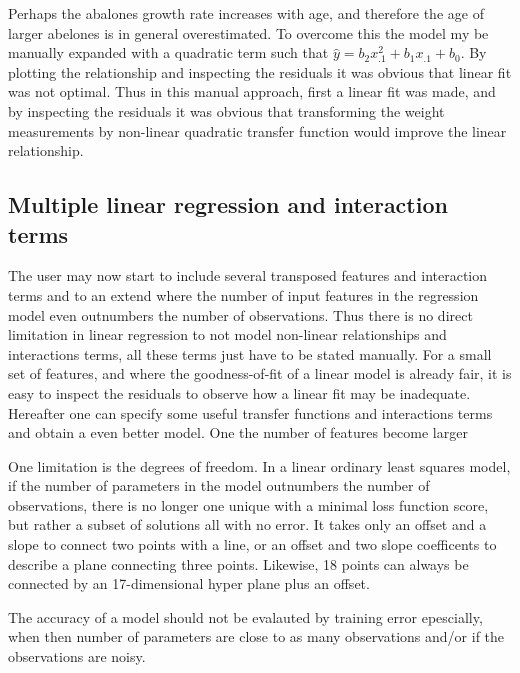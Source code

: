 Perhaps the abalones growth rate increases with age, and therefore the age of larger abelones is in general overestimated. To overcome this the model my be manually expanded with a quadratic term such that $\hat{y} = b_2 x_{.1}^2 + b_1 x_{.1} + b_0$. By plotting the relationship and inspecting the residuals it was obvious that linear fit was not optimal. Thus in this manual approach, first a linear fit was made, and by inspecting the residuals it was obvious that transforming the weight measurements by non-linear quadratic transfer function would improve the linear relationship.

\subsection{Multiple linear regression and interaction terms}
The user may now start to include several transposed features and interaction terms and to an extend where the number of input features in the regression model even outnumbers the number of observations. Thus there is no direct limitation in linear regression to not model non-linear relationships and interactions terms, all these terms just have to be stated manually. For a small set of features, and where the goodness-of-fit of a linear model is already fair, it is easy to inspect the residuals to observe how a linear fit may be inadequate. Hereafter one can specify some useful transfer functions and interactions terms and obtain a even better model. One the number of features become larger

One limitation is the degrees of freedom. In a linear ordinary least squares model, if the number of parameters in the model outnumbers the number of observations, there is no longer one unique with a minimal loss function score, but rather a subset of solutions all with no error. It takes only an offset and a slope to connect two points with a line, or an offset and two slope coefficents to describe a plane connecting three points. Likewise, 18 points can always be connected by an 17-dimensional hyper plane plus an offset.

The accuracy of a model should not be evalauted by training error epescially, when then number of parameters are close to as many observations and/or if the observations are noisy.

